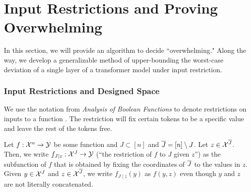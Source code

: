\newcommand{\ModelFinal}{\Model^{final}}
\newcommand{\peakToPeak}{\mathrm{PTP}}
\newcommand{\RepIndxs}{\mathcal{R}}
\newcommand{\FreeIndxs}{\mathcal{F}}
\newcommand{\softSumMaxF}{\alpha_{free}^{\max}}
\newcommand{\softSumMinR}{\alpha_{fix}^{\min}}
\newcommand{\softSumMaxR}{\alpha_{fix}^{\max}}
\newcommand{\softSumMinF}{\alpha_{free}^{\min}}

\newcommand{\ssMaxFA}{{\alpha}_{free}^{\max}}
\newcommand{\ssMinRA}{{\alpha}_{fix}^{\min}}
\newcommand{\ssMaxRA}{{\alpha}_{fix}^{\max}}
\newcommand{\ssMinFA}{{\alpha}_{free}^{\min}}


\newcommand{\ssMaxFB}{{\beta}_{free}^{\max}}
\newcommand{\ssMinRB}{{\beta}_{fix}^{\min}}
\newcommand{\ssMaxRB}{{\beta}_{fix}^{\max}}
\newcommand{\ssMinFB}{{\beta}_{free}^{\min}}

\newcommand{\logRMin}{L_{fix}^{\min}}
\newcommand{\logRMax}{L_{fix}^{\max}}
\newcommand{\logFMin}{L_{free}^{\min}}
\newcommand{\logFMax}{L_{free}^{\max}}
\newcommand{\Samp}{\textsf{Samp}}
\newcommand{\varAt}{{\Var_j^{(k)}}}
\newcommand{\varAtMin}{{\Var_{j, \min}^{(k)}}}
\newcommand{\varAtMax}{{\Var_{j, \max}^{(k)}}}
\newcommand{\preSMMax}{\ell_{i, \max}^{(k)}}
\newcommand{\preSMMin}{\ell_{i, \min}^{(k)}}

\section{Input Restrictions and Proving Overwhelming}
\label{sec:meta_framework}

In this section, we will provide an algorithm to decide ``overwhelming."
Along the way, we develop a generalizable method of upper-bounding the worst-case deviation of a single layer of a transformer model under input restriction.

\subsubsection*{Input Restrictions and Designed Space}
We use the notation from \textit{Analysis of Boolean Functions} to denote restrictions on inputs to a function \cite{o2014analysis}.
The restriction will fix certain tokens to be a specific value and leave the rest of the tokens free.

\begin{definition}
	\label{def:input_restriction}
	Let $f : \mathcal{X}^n \rightarrow \mathcal{Y}$ be some function and $J \subset [n]$ and ${\overline{J}} = [n] \setminus J$.
	Let $z \in \mathcal{X}^{\overline{J}}$.
	Then, we write $f_{J \mid z} : \mathcal{X}^J \rightarrow \mathcal{Y}$ (``the restriction of $f$ to $J$ given $z$'') as the subfunction of $f$ that is obtained by fixing the coordinates of ${\overline{J}}$ to the values in $z$.
	Given $y \in \mathcal{X}^J$ and $z \in \mathcal{X}^{\overline{J}}$, we write $f_{J \mid z}(y)$ as $f(y, z)$ even though $y$ and $z$ are not literally concatenated.
\end{definition}

